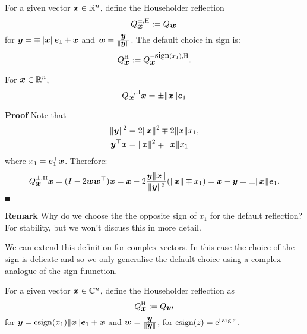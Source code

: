 \begin{definition} For a given vector $\bm{{\mbox{\boldmath$x$\unboldmath}}} \in {\mathbb R}^n$, define the Householder reflection
\[
Q_{\bm{{\mbox{\boldmath$x$\unboldmath}}}}^{\pm,\rm H} := Q_{\bm{{\mbox{\boldmath$w$\unboldmath}}}}
\]
for $\bm{{\mbox{\boldmath$y$\unboldmath}}} = \mp \|\bm{{\mbox{\boldmath$x$\unboldmath}}}\| \bm{{\mbox{\boldmath$e$\unboldmath}}}_1 + \bm{{\mbox{\boldmath$x$\unboldmath}}}$ and $\bm{{\mbox{\boldmath$w$\unboldmath}}} = {\bm{{\mbox{\boldmath$y$\unboldmath}}} \over \|\bm{{\mbox{\boldmath$y$\unboldmath}}}\|}$. The default choice in sign is:
\[
Q_{\bm{{\mbox{\boldmath$x$\unboldmath}}}}^{\rm H} := Q_{\bm{{\mbox{\boldmath$x$\unboldmath}}}}^{-\hbox{sign}(x_1),\rm H}.
\]
\end{definition}

\begin{lemma} For $\bm{{\mbox{\boldmath$x$\unboldmath}}} \in {\mathbb R}^n$,
\[
Q_{\bm{{\mbox{\boldmath$x$\unboldmath}}}}^{\pm,\rm H} \bm{{\mbox{\boldmath$x$\unboldmath}}} = \pm\|\bm{{\mbox{\boldmath$x$\unboldmath}}}\| \bm{{\mbox{\boldmath$e$\unboldmath}}}_1
\]
\end{lemma}
\textbf{Proof} Note that
\begin{align*}
\| \bm{{\mbox{\boldmath$y$\unboldmath}}} \|^2 &= 2\|\bm{{\mbox{\boldmath$x$\unboldmath}}}\|^2 \mp 2 \|\bm{{\mbox{\boldmath$x$\unboldmath}}}\| x_1, \\
\bm{{\mbox{\boldmath$y$\unboldmath}}}^\top \bm{{\mbox{\boldmath$x$\unboldmath}}} &= \|\bm{{\mbox{\boldmath$x$\unboldmath}}}\|^2 \mp  \|\bm{{\mbox{\boldmath$x$\unboldmath}}}\| x_1
\end{align*}
where $x_1 = \bm{{\mbox{\boldmath$e$\unboldmath}}}_1^\top \bm{{\mbox{\boldmath$x$\unboldmath}}}$. Therefore:
\[
Q_{\bm{{\mbox{\boldmath$x$\unboldmath}}}}^{\pm,\rm H} \bm{{\mbox{\boldmath$x$\unboldmath}}}  =  (I - 2 \bm{{\mbox{\boldmath$w$\unboldmath}}} \bm{{\mbox{\boldmath$w$\unboldmath}}}^\top) \bm{{\mbox{\boldmath$x$\unboldmath}}} = \bm{{\mbox{\boldmath$x$\unboldmath}}} - 2 {\bm{{\mbox{\boldmath$y$\unboldmath}}}  \|\bm{{\mbox{\boldmath$x$\unboldmath}}}\|  \over \|\bm{{\mbox{\boldmath$y$\unboldmath}}}\|^2} (\|\bm{{\mbox{\boldmath$x$\unboldmath}}}\|\mp x_1) = \bm{{\mbox{\boldmath$x$\unboldmath}}} - \bm{{\mbox{\boldmath$y$\unboldmath}}} =  \pm\|\bm{{\mbox{\boldmath$x$\unboldmath}}}\| \bm{{\mbox{\boldmath$e$\unboldmath}}}_1.
\]
\ensuremath{\QED}

\textbf{Remark} Why do we choose the the opposite sign of $x_1$ for the default reflection? For stability, but we won't discuss this in more detail.

We can extend this definition for complex vectors. In this case the choice of the sign is delicate and so we only generalise the default choice using a complex-analogue of the sign fuunction.

\begin{definition} For a given vector $\bm{{\mbox{\boldmath$x$\unboldmath}}} \in {\mathbb C}^n$, define the Householder reflection as
\[
Q_{\bm{{\mbox{\boldmath$x$\unboldmath}}}}^{\rm H} := Q_{\bm{{\mbox{\boldmath$w$\unboldmath}}}}
\]
for $\bm{{\mbox{\boldmath$y$\unboldmath}}} = {\rm csign}(x_1) \|\bm{{\mbox{\boldmath$x$\unboldmath}}}\| \bm{{\mbox{\boldmath$e$\unboldmath}}}_1 + \bm{{\mbox{\boldmath$x$\unboldmath}}}$ and $\bm{{\mbox{\boldmath$w$\unboldmath}}} = {\bm{{\mbox{\boldmath$y$\unboldmath}}} \over \|\bm{{\mbox{\boldmath$y$\unboldmath}}}\|}$, for ${\rm csign}(z) = {\rm e}^{{\rm i} \arg z}$.  \end{definition}

